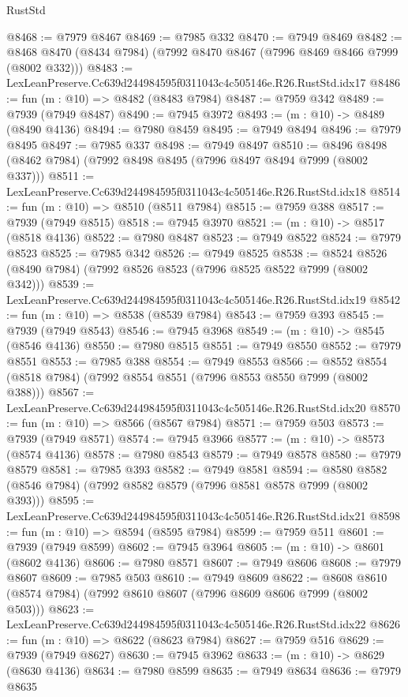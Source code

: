 \begin{lexlean}{RustStd}
\begin{coremodule}
@8468 := @7979 @8467
@8469 := @7985 @332
@8470 := @7949 @8469
@8482 := @8468 @8470 (@8434 @7984) (@7992 @8470 @8467 (@7996 @8469 @8466 @7999 (@8002 @332)))
@8483 := LexLeanPreserve.Cc639d244984595f0311043c4c505146e.R26.RustStd.idx17
@8486 := fun (m : @10) => @8482 (@8483 @7984)
@8487 := @7959 @342
@8489 := @7939 (@7949 @8487)
@8490 := @7945 @3972
@8493 := (m : @10) -> @8489 (@8490 @4136)
@8494 := @7980 @8459
@8495 := @7949 @8494
@8496 := @7979 @8495
@8497 := @7985 @337
@8498 := @7949 @8497
@8510 := @8496 @8498 (@8462 @7984) (@7992 @8498 @8495 (@7996 @8497 @8494 @7999 (@8002 @337)))
@8511 := LexLeanPreserve.Cc639d244984595f0311043c4c505146e.R26.RustStd.idx18
@8514 := fun (m : @10) => @8510 (@8511 @7984)
@8515 := @7959 @388
@8517 := @7939 (@7949 @8515)
@8518 := @7945 @3970
@8521 := (m : @10) -> @8517 (@8518 @4136)
@8522 := @7980 @8487
@8523 := @7949 @8522
@8524 := @7979 @8523
@8525 := @7985 @342
@8526 := @7949 @8525
@8538 := @8524 @8526 (@8490 @7984) (@7992 @8526 @8523 (@7996 @8525 @8522 @7999 (@8002 @342)))
@8539 := LexLeanPreserve.Cc639d244984595f0311043c4c505146e.R26.RustStd.idx19
@8542 := fun (m : @10) => @8538 (@8539 @7984)
@8543 := @7959 @393
@8545 := @7939 (@7949 @8543)
@8546 := @7945 @3968
@8549 := (m : @10) -> @8545 (@8546 @4136)
@8550 := @7980 @8515
@8551 := @7949 @8550
@8552 := @7979 @8551
@8553 := @7985 @388
@8554 := @7949 @8553
@8566 := @8552 @8554 (@8518 @7984) (@7992 @8554 @8551 (@7996 @8553 @8550 @7999 (@8002 @388)))
@8567 := LexLeanPreserve.Cc639d244984595f0311043c4c505146e.R26.RustStd.idx20
@8570 := fun (m : @10) => @8566 (@8567 @7984)
@8571 := @7959 @503
@8573 := @7939 (@7949 @8571)
@8574 := @7945 @3966
@8577 := (m : @10) -> @8573 (@8574 @4136)
@8578 := @7980 @8543
@8579 := @7949 @8578
@8580 := @7979 @8579
@8581 := @7985 @393
@8582 := @7949 @8581
@8594 := @8580 @8582 (@8546 @7984) (@7992 @8582 @8579 (@7996 @8581 @8578 @7999 (@8002 @393)))
@8595 := LexLeanPreserve.Cc639d244984595f0311043c4c505146e.R26.RustStd.idx21
@8598 := fun (m : @10) => @8594 (@8595 @7984)
@8599 := @7959 @511
@8601 := @7939 (@7949 @8599)
@8602 := @7945 @3964
@8605 := (m : @10) -> @8601 (@8602 @4136)
@8606 := @7980 @8571
@8607 := @7949 @8606
@8608 := @7979 @8607
@8609 := @7985 @503
@8610 := @7949 @8609
@8622 := @8608 @8610 (@8574 @7984) (@7992 @8610 @8607 (@7996 @8609 @8606 @7999 (@8002 @503)))
@8623 := LexLeanPreserve.Cc639d244984595f0311043c4c505146e.R26.RustStd.idx22
@8626 := fun (m : @10) => @8622 (@8623 @7984)
@8627 := @7959 @516
@8629 := @7939 (@7949 @8627)
@8630 := @7945 @3962
@8633 := (m : @10) -> @8629 (@8630 @4136)
@8634 := @7980 @8599
@8635 := @7949 @8634
@8636 := @7979 @8635

\end{coremodule}
\end{lexlean}
